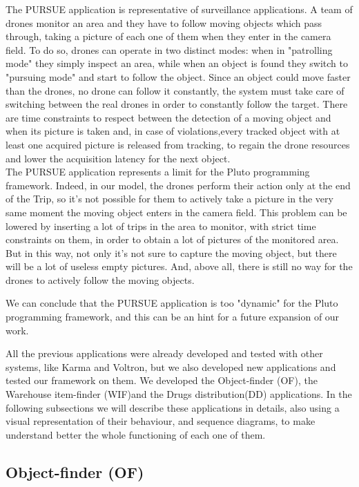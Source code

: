 The PURSUE application\cite{pursue} is representative of surveillance applications. A team of drones monitor an area and they have to follow moving objects which pass through, taking a picture of each one of them when they enter in the camera field.
To do so, drones can operate in two distinct modes: when in "patrolling mode" they simply inspect an area, while when an object is found they switch to "pursuing mode" and start to follow the object.
Since an object could move faster than the drones, no drone can follow it constantly, the system must take care of switching between the real drones in order to constantly follow the target.
There are time constraints to respect between the detection of a moving object and when its picture is taken and, in case of violations,every tracked object with at least one acquired picture is released from tracking, to regain the drone resources and lower the acquisition latency for the next object.
\\

The PURSUE application represents a limit for the Pluto programming framework.
Indeed, in our model, the drones perform their action only at the end of the Trip, so it's not possible for them to actively take a picture in the very same moment the moving object enters in the camera field.
This problem can be lowered by inserting a lot of trips in the area to monitor, with strict time constraints on them, in order to obtain a lot of pictures of the monitored area.
But in this way, not only it's not sure to capture the moving object, but there will be a lot of useless empty pictures.
And, above all, there is still no way for the drones to actively follow the moving objects.

We can conclude that the PURSUE application is too "dynamic" for the Pluto programming framework, and this can be an hint for a future expansion of our work.


\newpage

All the previous applications were already developed and tested with other systems, like Karma\cite{karma} and Voltron\cite{voltron}, but we also developed new applications and tested our framework on them.
We developed the Object-finder (OF), the Warehouse item-finder (WIF)and the Drugs distribution(DD) applications.
In the following subsections we will describe these applications in details, also using a visual representation of their behaviour, and sequence diagrams, to make understand better the whole functioning of each one of them.

\subsection{Object-finder (OF)}

